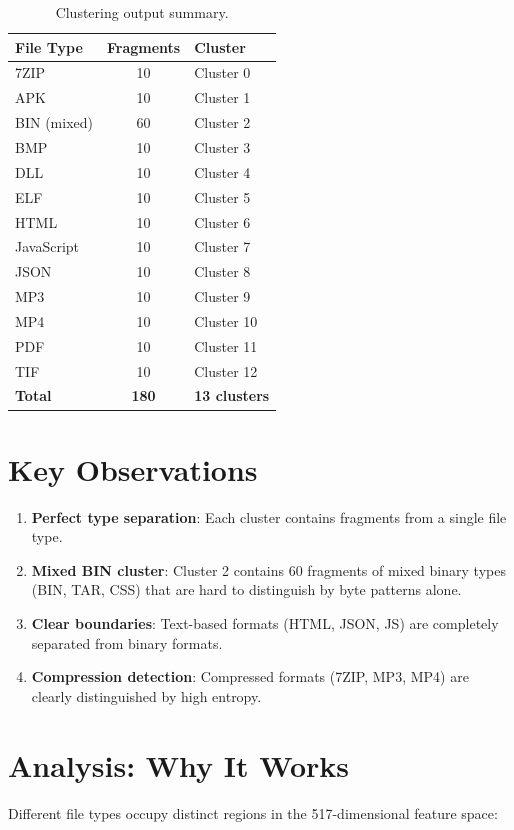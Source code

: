 \documentclass[12pt,a4paper]{report}
\begin{document}
\begin{normalsize}
{\begin{table}[H]
\centering
\caption{Clustering output summary.}
\label{tab:cluster_output}
\begin{tabular}{lcl}
\toprule
\textbf{File Type} & \textbf{Fragments} & \textbf{Cluster} \\
\midrule
7ZIP & 10 & Cluster 0 \\
APK & 10 & Cluster 1 \\
BIN (mixed) & 60 & Cluster 2 \\
BMP & 10 & Cluster 3 \\
DLL & 10 & Cluster 4 \\
ELF & 10 & Cluster 5 \\
HTML & 10 & Cluster 6 \\
JavaScript & 10 & Cluster 7 \\
JSON & 10 & Cluster 8 \\
MP3 & 10 & Cluster 9 \\
MP4 & 10 & Cluster 10 \\
PDF & 10 & Cluster 11 \\
TIF & 10 & Cluster 12 \\
\midrule
\textbf{Total} & \textbf{180} & \textbf{13 clusters} \\
\bottomrule
\end{tabular}
\end{table}
\par}

\section{Key Observations}
{\setlength{\baselineskip}{1.0\baselineskip}
\begin{enumerate}
    \item \textbf{Perfect type separation}: Each cluster contains fragments from a single file type.
    \item \textbf{Mixed BIN cluster}: Cluster 2 contains 60 fragments of mixed binary types (BIN, TAR, CSS) that are hard to distinguish by byte patterns alone.
    \item \textbf{Clear boundaries}: Text-based formats (HTML, JSON, JS) are completely separated from binary formats.
    \item \textbf{Compression detection}: Compressed formats (7ZIP, MP3, MP4) are clearly distinguished by high entropy.
\end{enumerate}
\par}

\section{Analysis: Why It Works}
{\setlength{\baselineskip}{1.0\baselineskip}
Different file types occupy distinct regions in the 517-dimensional feature space:

}
\end{normalsize}
\end{document}
